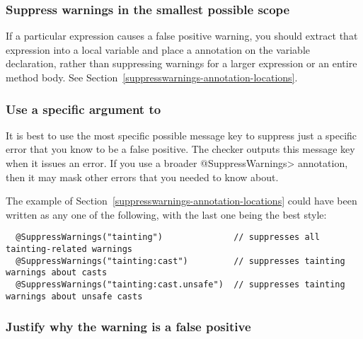 \subsubsection{Suppress warnings in the smallest possible scope\label{suppresswarnings-best-practices-smallest-scope}}

If a particular expression causes a
false positive warning, you should extract that expression into a local variable
and place a  annotation on the variable
declaration, rather than suppressing warnings for a larger expression or an
entire method body.  See Section~\ref{suppresswarnings-annotation-locations}.



\subsubsection{Use a specific argument to \label{suppresswarnings-best-practices-specific-argument}}


\label{compiler-message-keys}

It is best to use the most specific possible message key to suppress just a
specific error that you know to be a false positive.  The checker outputs
this message key when it issues an error.  If you use a broader
\<@SuppressWarnings> annotation, then it may mask other errors that you
needed to know about.

The example of Section~\ref{suppresswarnings-annotation-locations} could
have been written as any one of the following, with the last one being the
best style:

\begin{Verbatim}
  @SuppressWarnings("tainting")              // suppresses all tainting-related warnings
  @SuppressWarnings("tainting:cast")         // suppresses tainting warnings about casts
  @SuppressWarnings("tainting:cast.unsafe")  // suppresses tainting warnings about unsafe casts
\end{Verbatim}


\subsubsection{Justify why the warning is a false positive\label{suppresswarnings-best-practices-justification}}

